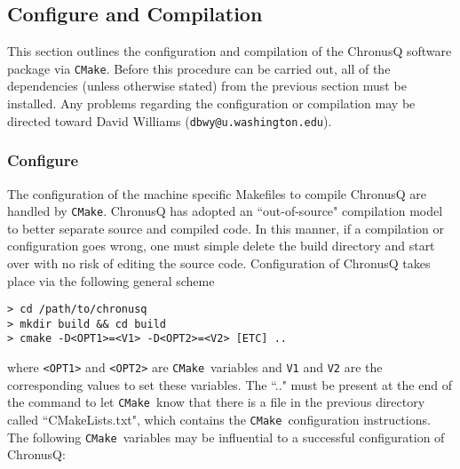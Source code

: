 \documentclass[12pt]{article}
\makeatletter
\newcommand{\DBWYContact}{David Williams (\texttt{dbwy@u.washington.edu})}
\newcommand{\CMake}{\texttt{CMake}}
\makeatother
\begin{document}
    \subsection{Configure and Compilation} \label{subsec:ChronusQConfigCompile}
    
    This section outlines the configuration and compilation of the ChronusQ
    software package via \CMake. Before this procedure can be carried out,
    all of the dependencies (unless otherwise stated) from the previous section
    must be installed. Any problems regarding the configuration or compilation
    may be directed toward \DBWYContact.

    \subsubsection{Configure} \label{subsubsec:ChronusQConfig}

    The configuration of the machine specific Makefiles to compile ChronusQ are
    handled by \CMake. ChronusQ has adopted an ``out-of-source" compilation model
    to better separate source and compiled code. In this manner, if a compilation
    or configuration goes wrong, one must simple delete the build directory and 
    start over with no risk of editing the source code. Configuration of ChronusQ
    takes place via the following general scheme
    
    \begin{lstlisting}
> cd /path/to/chronusq
> mkdir build && cd build
> cmake -D<OPT1>=<V1> -D<OPT2>=<V2> [ETC] ..
    \end{lstlisting}

    \noindent where \texttt{<OPT1>} and \texttt{<OPT2>} are \CMake~variables 
    and \texttt{V1} and \texttt{V2} are the corresponding values to set these 
    variables. The ``.." must be present at the end of the command to let 
    \CMake~know that there is a file in the previous directory called 
    ``CMakeLists.txt", which contains the \CMake~configuration instructions. The 
    following \CMake~variables may be influential to a successful configuration of 
    ChronusQ:
\end{document}
